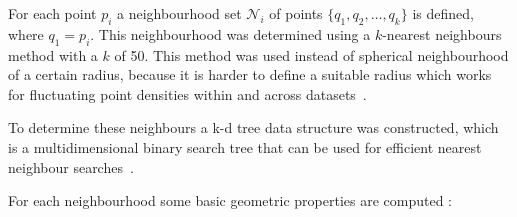For each point \(p_{i}\) a neighbourhood set \(\mathcal{N}_{i}\) of points \(\{q_{1}, q_{2}, \dots, q_{k}\}\) is defined, where \(q_{1} = p_{i}\). 
This neighbourhood was determined using a \(k\)-nearest neighbours method with a \(k\) of 50. This method was used instead of spherical neighbourhood of a certain radius, because it is harder to define a suitable radius which works for fluctuating point densities within and across datasets~\citep{weinmann2014semantic}.

To determine these neighbours a k-d tree data structure was constructed, which is a multidimensional binary search tree that can be used for efficient nearest neighbour searches~\citep{bentley1975kdtree}.

For each neighbourhood some basic geometric properties are computed \citep{weinmann2015semantic}:


